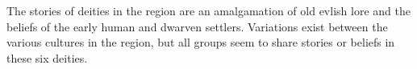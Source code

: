 The stories of deities in the region are an amalgamation of old evlish lore and the beliefs of the early human and dwarven settlers.
Variations exist between the various cultures in the region, but all groups seem to share stories or beliefs in these six deities.
